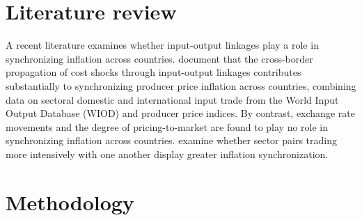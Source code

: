 \documentclass[11pt,a4paper]{article}
\begin{document}
\label{sec:intro}


\section{Literature review}
\label{sec:lit}
A recent literature examines whether input-output linkages play a role in synchronizing inflation across countries.
\cite{Auer2017} document that the cross-border propagation of cost shocks through input-output
linkages contributes substantially to synchronizing producer price inflation across countries, combining data on sectoral domestic and international input trade from the World Input Output
Database (WIOD) and producer price indices. By contrast, exchange rate movements and the degree of pricing-to-market are found to play no role in synchronizing inflation across countries.
\cite{AntoundeAlmeida2016} examine whether sector pairs trading more intensively with one another display greater inflation synchronization.




\section{Methodology }
\label{sec:metho}
\end{document}
